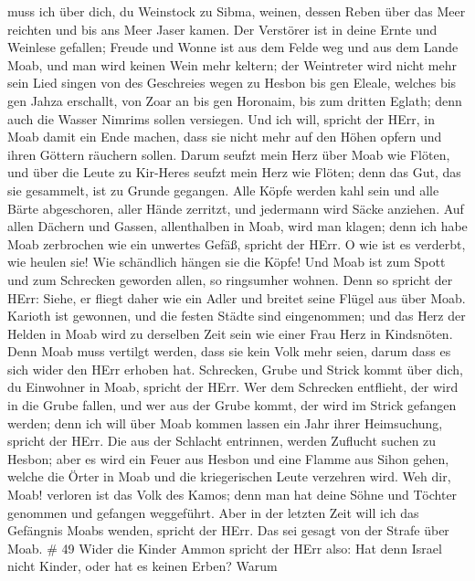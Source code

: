 muss ich über dich, du Weinstock zu Sibma, weinen, dessen Reben über das
Meer reichten und bis ans Meer Jaser kamen. Der Verstörer ist in deine
Ernte und Weinlese gefallen;  Freude und Wonne ist aus dem
Felde weg und aus dem Lande Moab, und man wird keinen Wein mehr keltern;
der Weintreter wird nicht mehr sein Lied singen  von des
Geschreies wegen zu Hesbon bis gen Eleale, welches bis gen Jahza
erschallt, von Zoar an bis gen Horonaim, bis zum dritten Eglath; denn
auch die Wasser Nimrims sollen versiegen.  Und ich will,
spricht der HErr, in Moab damit ein Ende machen, dass sie nicht mehr auf
den Höhen opfern und ihren Göttern räuchern sollen.  Darum
seufzt mein Herz über Moab wie Flöten, und über die Leute zu Kir-Heres
seufzt mein Herz wie Flöten; denn das Gut, das sie gesammelt, ist zu
Grunde gegangen.  Alle Köpfe werden kahl sein und alle
Bärte abgeschoren, aller Hände zerritzt, und jedermann wird Säcke
anziehen.  Auf allen Dächern und Gassen, allenthalben in
Moab, wird man klagen; denn ich habe Moab zerbrochen wie ein unwertes
Gefäß, spricht der HErr.  O wie ist es verderbt, wie heulen
sie! Wie schändlich hängen sie die Köpfe! Und Moab ist zum Spott und zum
Schrecken geworden allen, so ringsumher wohnen.  Denn so
spricht der HErr: Siehe, er fliegt daher wie ein Adler und breitet seine
Flügel aus über Moab.  Karioth ist gewonnen, und die festen
Städte sind eingenommen; und das Herz der Helden in Moab wird zu
derselben Zeit sein wie einer Frau Herz in Kindsnöten. 
Denn Moab muss vertilgt werden, dass sie kein Volk mehr seien, darum
dass es sich wider den HErr erhoben hat.  Schrecken, Grube
und Strick kommt über dich, du Einwohner in Moab, spricht der HErr.
 Wer dem Schrecken entflieht, der wird in die Grube fallen,
und wer aus der Grube kommt, der wird im Strick gefangen werden; denn
ich will über Moab kommen lassen ein Jahr ihrer Heimsuchung, spricht der
HErr.  Die aus der Schlacht entrinnen, werden Zuflucht
suchen zu Hesbon; aber es wird ein Feuer aus Hesbon und eine Flamme aus
Sihon gehen, welche die Örter in Moab und die kriegerischen Leute
verzehren wird.  Weh dir, Moab! verloren ist das Volk des
Kamos; denn man hat deine Söhne und Töchter genommen und gefangen
weggeführt.  Aber in der letzten Zeit will ich das
Gefängnis Moabs wenden, spricht der HErr. Das sei gesagt von der Strafe
über Moab. \# 49  Wider die Kinder Ammon spricht der HErr
also: Hat denn Israel nicht Kinder, oder hat es keinen Erben? Warum
